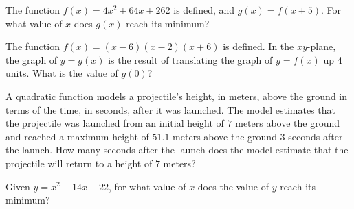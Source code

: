\vspace{0.75em}


\vspace{2em}


\noindent\markforreview
\vspace{1em}

The function $f(x) = 4x^2 + 64x + 262$ is defined, and $g(x) = f(x + 5)$.  
For what value of $x$ does $g(x)$ reach its minimum?

\vspace{0.75em}



\newpage

\noindent\markforreview
\vspace{1em}

The function $f(x) = (x - 6)(x - 2)(x + 6)$ is defined.  
In the $xy$-plane, the graph of $y = g(x)$ is the result of translating the graph of $y = f(x)$ up 4 units.  
What is the value of $g(0)$?

\vspace{2em}

\noindent\markforreview
\vspace{1em}

A quadratic function models a projectile’s height, in meters, above the ground in terms of the time, in seconds, after it was launched.  
The model estimates that the projectile was launched from an initial height of $7$ meters above the ground and reached a maximum height of $51.1$ meters above the ground $3$ seconds after the launch.  
How many seconds after the launch does the model estimate that the projectile will return to a height of $7$ meters?

\vspace{0.75em}


\vspace{2em}

\noindent\markforreview
\vspace{1em}

Given $y = x^2 - 14x + 22$,  
for what value of $x$ does the value of $y$ reach its minimum?

\vspace{3em}


